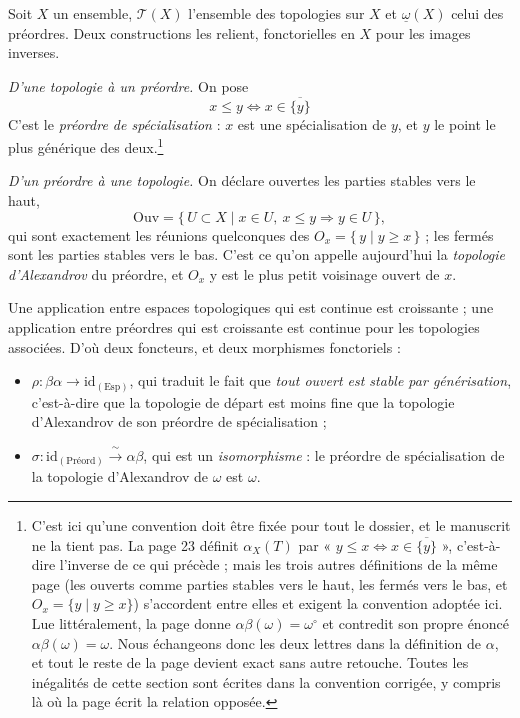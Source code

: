 \documentclass[11pt,a4paper]{article}
\begin{document}
Soit $X$ un ensemble, $\mathcal{T}(X)$ l'ensemble des topologies sur $X$ et
$\underline{\omega}(X)$ celui des préordres. Deux constructions les relient,
fonctorielles en $X$ pour les images inverses.

\emph{D'une topologie à un préordre.} On pose
\[
x \leq y \iff x \in \overline{\{y\}}
\]
C'est le \emph{préordre de spécialisation} : $x$ est une spécialisation de $y$, et
$y$ le point le plus générique des deux.\footnote{C'est ici qu'une convention
doit être fixée pour tout le dossier, et le manuscrit ne la tient pas. La page
23 définit $\alpha_{X}(T)$ par « $y \leq x \iff x \in \overline{\{y\}}$ »,
c'est-à-dire l'inverse de ce qui précède ; mais les trois autres définitions de
la même page (les ouverts comme parties stables vers le haut, les fermés vers
le bas, et $O_{x} = \{y \mid y \geq x\}$) s'accordent entre elles et exigent
la convention adoptée ici. Lue littéralement, la page donne
$\alpha\beta(\omega) = \omega^{\circ}$ et contredit son propre énoncé
$\alpha\beta(\omega) = \omega$. Nous échangeons donc les deux lettres dans la
définition de $\alpha$, et tout le reste de la page devient exact sans autre
retouche. Toutes les inégalités de cette section sont écrites dans la
convention corrigée, y compris là où la page écrit la relation opposée.}

\emph{D'un préordre à une topologie.} On déclare ouvertes les parties stables
vers le haut,
\[
\mathrm{Ouv} = \{\, U \subset X \mid x \in U,\ x \leq y \Rightarrow y \in U \,\},
\]
qui sont exactement les réunions quelconques des
$O_{x} = \{\, y \mid y \geq x \,\}$ ; les fermés sont les parties stables vers
le bas. C'est ce qu'on appelle aujourd'hui la \emph{topologie d'Alexandrov} du
préordre, et $O_{x}$ y est le plus petit voisinage ouvert de $x$.

Une application entre espaces topologiques qui est continue est croissante ;
une application entre préordres qui est croissante est continue pour les
topologies associées. D'où deux foncteurs, et deux morphismes fonctoriels :

\begin{itemize}
\item $\rho : \beta\alpha \to \mathrm{id}_{(\mathrm{Esp})}$, qui traduit le fait
que \emph{tout ouvert est stable par générisation}, c'est-à-dire que la
topologie de départ est moins fine que la topologie d'Alexandrov de son
préordre de spécialisation ;
\item $\sigma : \mathrm{id}_{(\text{Préord})} \xrightarrow{\ \sim\ } \alpha\beta$,
qui est un \emph{isomorphisme} : le préordre de spécialisation de la topologie
d'Alexandrov de $\omega$ est $\omega$.
\end{itemize}
\end{document}
